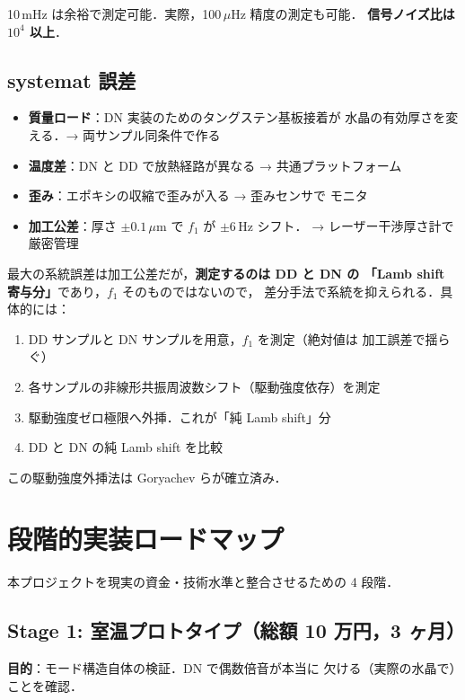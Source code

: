 \documentclass[11pt,a4paper]{article}
\begin{document}
10\,mHz は余裕で測定可能．実際，100\,$\mu$Hz 精度の測定も可能．
\textbf{信号ノイズ比は $10^4$ 以上}．

\subsection{systemat 誤差}

\begin{itemize}
\item \textbf{質量ロード}：DN 実装のためのタングステン基板接着が
水晶の有効厚さを変える．→ 両サンプル同条件で作る
\item \textbf{温度差}：DN と DD で放熱経路が異なる → 共通プラットフォーム
\item \textbf{歪み}：エポキシの収縮で歪みが入る → 歪みセンサで
モニタ
\item \textbf{加工公差}：厚さ $\pm 0.1\,\mu$m で $f_1$ が $\pm 6$\,Hz シフト．
→ レーザー干渉厚さ計で厳密管理
\end{itemize}

最大の系統誤差は加工公差だが，\textbf{測定するのは DD と DN の
「Lamb shift 寄与分」}であり，$f_1$ そのものではないので，
差分手法で系統を抑えられる．具体的には：

\begin{enumerate}
\item DD サンプルと DN サンプルを用意，$f_1$ を測定（絶対値は
加工誤差で揺らぐ）
\item 各サンプルの非線形共振周波数シフト（駆動強度依存）を測定
\item 駆動強度ゼロ極限へ外挿．これが「純 Lamb shift」分
\item DD と DN の純 Lamb shift を比較
\end{enumerate}

この駆動強度外挿法は Goryachev らが確立済み．

\section{段階的実装ロードマップ}

本プロジェクトを現実の資金・技術水準と整合させるための 4 段階．

\subsection{Stage 1: 室温プロトタイプ（総額 10 万円，3 ヶ月）}

\textbf{目的}：モード構造自体の検証．DN で偶数倍音が本当に
欠ける（実際の水晶で）ことを確認．
\end{document}
